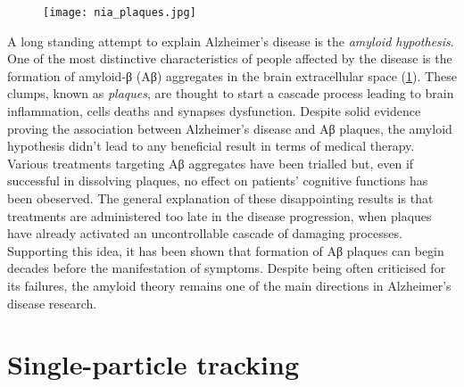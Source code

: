 \begin{figure}
  \label{fig:plaques}
  \texttt{[image: nia\_plaques.jpg]}
\end{figure}

A long standing attempt to explain Alzheimer’s disease is the \emph{amyloid hypothesis}. One of the most distinctive characteristics of people affected by the disease is the formation of amyloid-β (Aβ) aggregates in the brain extracellular space (\cref{fig:plaques}). These clumps, known as \emph{plaques}, are thought to start a cascade process leading to brain inflammation, cells deaths and synapses dysfunction. Despite solid evidence proving the association between Alzheimer's disease and Aβ plaques, the amyloid hypothesis didn't lead to any beneficial result in terms of medical therapy. Various treatments targeting Aβ aggregates have been trialled but, even if successful in dissolving plaques, no effect on patients' cognitive functions has been obeserved. The general explanation of these disappointing results is that treatments are administered too late in the disease progression, when plaques have already activated an uncontrollable cascade of damaging processes. Supporting this idea, it has been shown that formation of Aβ plaques can begin decades before the manifestation of symptoms. Despite being often criticised for its failures, the amyloid theory remains one of the main directions in Alzheimer's disease research.



\section{Single-particle tracking}
